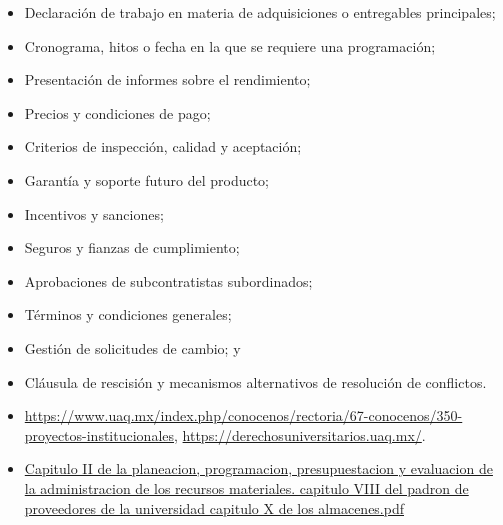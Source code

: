 \documentclass[letterpaper,12pt,openright,oneside]{article}
\theoremstyle{plain}
\begin{document}
\begin{itemize}
    \item Declaración de trabajo en materia de adquisiciones o entregables principales;
    \item Cronograma, hitos o fecha en la que se requiere una programación;
    \item Presentación de informes sobre el rendimiento;
    \item Precios y condiciones de pago;
    \item Criterios de inspección, calidad y aceptación;
    \item Garantía y soporte futuro del producto;
    \item Incentivos y sanciones;
    \item Seguros y fianzas de cumplimiento;
    \item Aprobaciones de subcontratistas subordinados;
    \item Términos y condiciones generales;
    \item Gestión de solicitudes de cambio; y
    \item Cláusula de rescisión y mecanismos alternativos de resolución de conflictos.
    \item \url{https://www.uaq.mx/index.php/conocenos/rectoria/67-conocenos/350-proyectos-institucionales}, \url{https://derechosuniversitarios.uaq.mx/}.
    \item \href{run:https://www.uaq.mx/leyes/regadqu.pdf}{Capitulo II de la planeacion, programacion, presupuestacion y evaluacion de la administracion de los recursos materiales. capitulo VIII del padron de proveedores de la universidad capitulo X de los almacenes.pdf}
\end{itemize}

% 
% 
\end{document}

